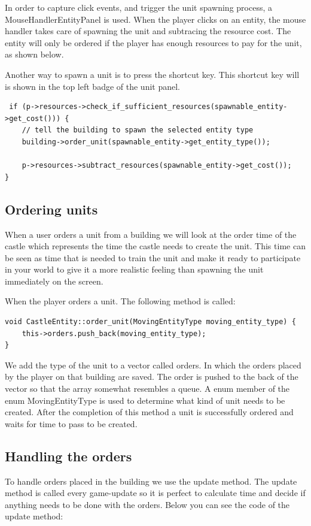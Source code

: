 In order to capture click events, and trigger the unit spawning process, a MouseHandlerEntityPanel is used. When the player clicks on an entity, the mouse handler takes care of spawning the unit and subtracing the resource cost. The entity will only be ordered if the player has enough resources to pay for the unit, as shown below.

Another way to spawn a unit is to press the shortcut key. This shortcut key will is shown in the top left badge of the unit panel.

\begin{lstlisting}
 if (p->resources->check_if_sufficient_resources(spawnable_entity->get_cost())) {
    // tell the building to spawn the selected entity type
    building->order_unit(spawnable_entity->get_entity_type());
    
    p->resources->subtract_resources(spawnable_entity->get_cost());
}
\end{lstlisting}

\subsection{Ordering units}
When a user orders a unit from a building we will look at the order time of the castle which represents the time the castle needs to create the unit. This time can be seen as time that is needed to train the unit and make it ready to participate in your world to give it a more realistic feeling than spawning the unit immediately on the screen. 

When the player orders a unit. The following method is called:

\begin{lstlisting}
void CastleEntity::order_unit(MovingEntityType moving_entity_type) {
    this->orders.push_back(moving_entity_type);
}
\end{lstlisting}

We add the type of the unit to a vector called orders. In which the orders placed by the player on that building are saved. The order is pushed to the back of the vector so that the array somewhat resembles a queue. A enum member of the enum MovingEntityType is used to determine what kind of unit needs to be created. After the completion of this method a unit is successfully ordered and waits for time to pass to be created.

\subsection{Handling the orders}
To handle orders placed in the building we use the update method. The update method is called every game-update so it is perfect to calculate time and decide if anything needs to be done with the orders. Below you can see the code of the update method:

